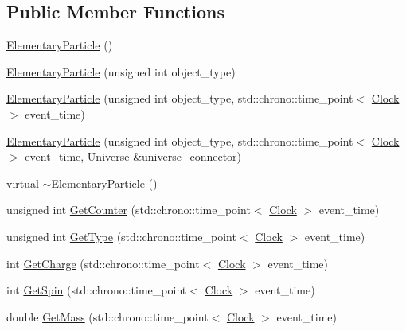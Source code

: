 \subsection*{Public Member Functions}
\begin{DoxyCompactItemize}
\item 
\hyperlink{class_elementary_particle_a4035ffd6ce053ea3390632fa530c6e21}{Elementary\+Particle} ()
\item 
\hyperlink{class_elementary_particle_a6bd3ad699e15769c1860e3068020a824}{Elementary\+Particle} (unsigned int object\+\_\+type)
\item 
\hyperlink{class_elementary_particle_a371e2742ab8b5ce0fe55ef4adbaed3af}{Elementary\+Particle} (unsigned int object\+\_\+type, std\+::chrono\+::time\+\_\+point$<$ \hyperlink{universe_8h_a0ef8d951d1ca5ab3cfaf7ab4c7a6fd80}{Clock} $>$ event\+\_\+time)
\item 
\hyperlink{class_elementary_particle_a0b43033247b36096d0de2a7553c620a9}{Elementary\+Particle} (unsigned int object\+\_\+type, std\+::chrono\+::time\+\_\+point$<$ \hyperlink{universe_8h_a0ef8d951d1ca5ab3cfaf7ab4c7a6fd80}{Clock} $>$ event\+\_\+time, \hyperlink{class_universe}{Universe} \&universe\+\_\+connector)
\item 
virtual \hyperlink{class_elementary_particle_a5adce47bf88a5381c88a4d40f87fe76f}{$\sim$\+Elementary\+Particle} ()
\item 
unsigned int \hyperlink{class_elementary_particle_a371b9b9bc520047c42d9e6d06b7f3dd9}{Get\+Counter} (std\+::chrono\+::time\+\_\+point$<$ \hyperlink{universe_8h_a0ef8d951d1ca5ab3cfaf7ab4c7a6fd80}{Clock} $>$ event\+\_\+time)
\item 
unsigned int \hyperlink{class_elementary_particle_a63fe7df86d2fba4a64a69dfa5757e94e}{Get\+Type} (std\+::chrono\+::time\+\_\+point$<$ \hyperlink{universe_8h_a0ef8d951d1ca5ab3cfaf7ab4c7a6fd80}{Clock} $>$ event\+\_\+time)
\item 
int \hyperlink{class_elementary_particle_af3ebb984cfe957b2e76463c22e4b5bb5}{Get\+Charge} (std\+::chrono\+::time\+\_\+point$<$ \hyperlink{universe_8h_a0ef8d951d1ca5ab3cfaf7ab4c7a6fd80}{Clock} $>$ event\+\_\+time)
\item 
int \hyperlink{class_elementary_particle_ad5f5a05770f94f4c8fee418d59098126}{Get\+Spin} (std\+::chrono\+::time\+\_\+point$<$ \hyperlink{universe_8h_a0ef8d951d1ca5ab3cfaf7ab4c7a6fd80}{Clock} $>$ event\+\_\+time)
\item 
double \hyperlink{class_elementary_particle_a85400dc97f66c1ce23d9d961ddb6b8f3}{Get\+Mass} (std\+::chrono\+::time\+\_\+point$<$ \hyperlink{universe_8h_a0ef8d951d1ca5ab3cfaf7ab4c7a6fd80}{Clock} $>$ event\+\_\+time)

\end{DoxyCompactItemize}
